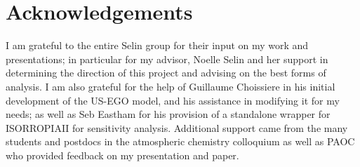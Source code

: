 \documentclass[12]{article}
\begin{document}
\section{Acknowledgements}
I am grateful to the entire Selin group for their input on my work and presentations; in particular for my advisor, Noelle Selin and her support in determining the direction of this project and advising on the best forms of analysis. I am also grateful for the help of Guillaume Choissiere in his initial development of the US-EGO model, and his assistance in modifying it for my needs; as well as Seb Eastham for his provision of a standalone wrapper for ISORROPIAII for sensitivity analysis. Additional support came from the many students and postdocs in the atmospheric chemistry colloquium as well as PAOC who provided feedback on my presentation and paper. 

\pagebreak


\end{document}

